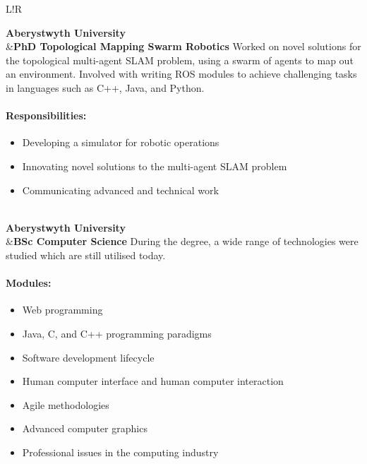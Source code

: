 \documentclass[10pt]{article}
\newcommand\VRule{\color{lightgray}\vrule width 0.5pt}
\begin{document}
\begin{longtable}{L!{\VRule}R}

{\bf Aberystwyth University}\\
&{\bf PhD Topological Mapping Swarm Robotics}\newline
Worked on novel solutions for the topological multi-agent SLAM problem, using a swarm of agents to map out an environment. Involved with writing ROS modules to achieve challenging tasks in languages such as C++, Java, and Python.

\vspace{-3mm}
\paragraph{Responsibilities:}
\begin{itemize}[noitemsep,topsep=0pt]
	\item Developing a simulator for robotic operations
	\item Innovating novel solutions to the multi-agent SLAM problem
	\item Communicating advanced and technical work
\end{itemize}
\\

{\bf Aberystwyth University}\\
&{\bf BSc Computer Science}\newline
During the degree, a wide range of technologies were studied which are still utilised today.

\vspace{-3mm}
\paragraph{Modules:}
\begin{itemize}[noitemsep,topsep=0pt]
    \item Web programming
    \item Java, C, and C++ programming paradigms
    \item Software development lifecycle
    \item Human computer interface and human computer interaction
    \item Agile methodologies
    \item Advanced computer graphics
    \item Professional issues in the computing industry
\end{itemize}
\\

\end{longtable}
\end{document}
